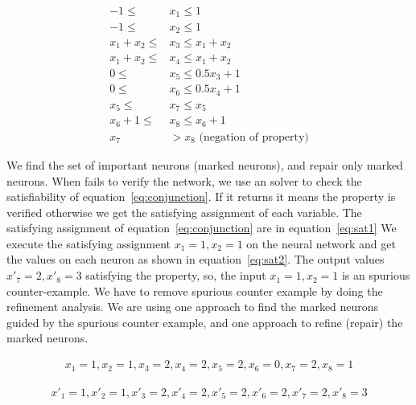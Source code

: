 \begin{equation}
    \begin{aligned}
        -1 \leq & x_1 \leq 1 \\ 
        -1 \leq & x_2 \leq 1 \\
         x_1 + x_2 \leq & x_3 \leq x_1 + x_2 \\
         x_1 + x_2 \leq & x_4 \leq x_1 + x_2 \\
         0 \leq & x_5 \leq 0.5x_3+1 \\ 
         0 \leq & x_6 \leq 0.5x_4 + 1 \\
         x_5 \leq & x_7 \leq x_5 \\ 
         x_6+1 \leq & x_8 \leq x_6+1 \\
         x_7 & > x_8 \text{ (negation of property)}
    \end{aligned}
\label{eq:conjunction}
\end{equation}

We find the set of important neurons (marked neurons), and repair only marked neurons. 
When \deeppoly{} fails to verify the network, we use an \milp{} solver to check the satisfiability
of equation~\ref{eq:conjunction}. 
If it returns \unsat{} it means the property is verified otherwise we get the satisfying assignment of each variable. 
The satisfying assignment of equation~\ref{eq:conjunction} are in equation~\ref{eq:sat1}
We execute the satisfying assignment $x_1=1,x_2=1$ on the neural network and get the values on each neuron 
as shown in equation~\ref{eq:sat2}. 
The output values $x'_7=2, x'_8=3$ satisfying the property, so, the input $x_1=1, x_2=1$ is an spurious counter-example. 
We have to remove spurious counter example by doing the refinement analysis. 
We are using one approach to find the marked neurons guided by the spurious counter example, 
and one approach to refine (repair) the marked neurons.


\begin{equation}
    \begin{aligned}
        x_1=1, x_2=1, x_3=2, x_4=2, x_5=2, x_6=0, x_7=2, x_8=1
    \end{aligned}
\label{eq:sat1}
\end{equation}

\begin{equation}
    \begin{aligned}
        x'_1=1, x'_2=1, x'_3=2, x'_4=2, x'_5=2, x'_6=2, x'_7=2, x'_8=3
    \end{aligned}
\label{eq:sat2}
\end{equation}




